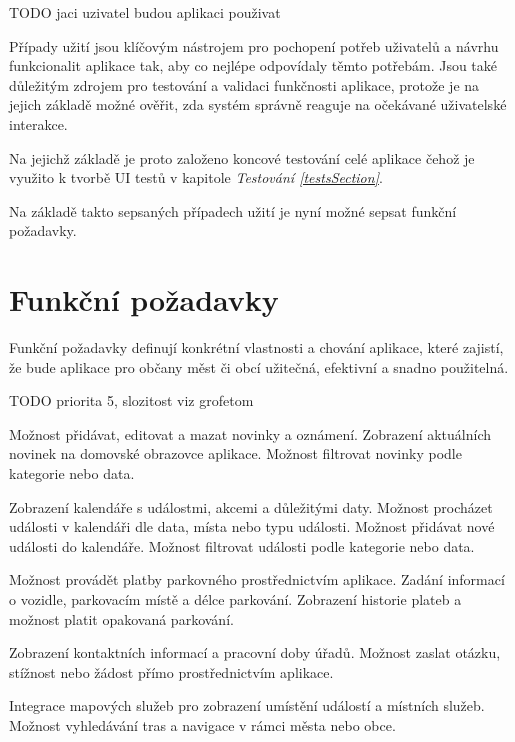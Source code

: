 TODO jaci uzivatel budou aplikaci použivat

\bigskip

Případy užití jsou klíčovým nástrojem pro pochopení potřeb uživatelů a návrhu funkcionalit aplikace tak, aby co nejlépe odpovídaly těmto potřebám. 
Jsou také důležitým zdrojem pro testování a validaci funkčnosti aplikace, protože je na jejich základě možné ověřit, zda systém správně reaguje na očekávané 
uživatelské interakce. 

Na jejichž základě je proto založeno koncové testování celé aplikace čehož je využito k tvorbě UI testů v kapitole \textit{Testování \ref{testsSection}}.

Na základě takto sepsaných případech užití je nyní možné sepsat funkční požadavky.

\section{Funkční požadavky}
Funkční požadavky definují konkrétní vlastnosti a chování aplikace, které zajistí, že bude aplikace pro občany měst či obcí 
užitečná, efektivní a snadno použitelná.

TODO priorita 5, slozitost viz grofetom

Možnost přidávat, editovat a mazat novinky a oznámení.
Zobrazení aktuálních novinek na domovské obrazovce aplikace.
Možnost filtrovat novinky podle kategorie nebo data.

Zobrazení kalendáře s událostmi, akcemi a důležitými daty.
Možnost procházet události v kalendáři dle data, místa nebo typu události.
Možnost přidávat nové události do kalendáře.
Možnost filtrovat události podle kategorie nebo data.

Možnost provádět platby parkovného prostřednictvím aplikace.
Zadání informací o vozidle, parkovacím místě a délce parkování.
Zobrazení historie plateb a možnost platit opakovaná parkování.

Zobrazení kontaktních informací a pracovní doby úřadů.
Možnost zaslat otázku, stížnost nebo žádost přímo prostřednictvím aplikace.

Integrace mapových služeb pro zobrazení umístění událostí a místních služeb.
Možnost vyhledávání tras a navigace v rámci města nebo obce.

